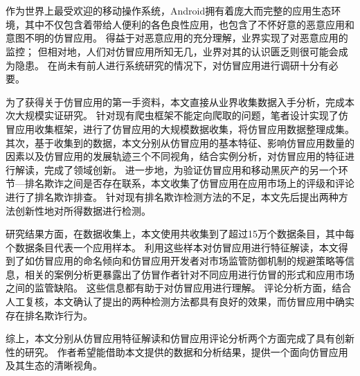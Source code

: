 \cleardoublepage{}

\chapter*{}
\vspace{-5mm}

\setlength{\baselineskip}{25pt} %

作为世界上最受欢迎的移动操作系统，Android拥有着庞大而完整的应用生态环境，其中不仅包含着带给人便利的各色良性应用，也包含了不怀好意的恶意应用和意图不明的仿冒应用。
得益于对恶意应用的充分理解，业界实现了对恶意应用的监控；
但相对地，人们对仿冒应用所知无几，业界对其的认识匮乏则很可能会成为隐患。
在尚未有前人进行系统研究的情况下，对仿冒应用进行调研十分有必要。

为了获得关于仿冒应用的第一手资料，本文直接从业界收集数据入手分析，完成本次大规模实证研究。
针对现有爬虫框架不能定向爬取的问题，笔者设计实现了仿冒应用收集框架\mytool ，进行了仿冒应用的大规模数据收集，将仿冒应用数据整理成集。
其次，基于收集到的数据，本文分别从仿冒应用的基本特征、影响仿冒应用数量的因素以及仿冒应用的发展轨迹三个不同视角，结合实例分析，对仿冒应用的特征进行解读，完成了领域创新。
进一步地，为验证仿冒应用和移动黑灰产的另一个环节---排名欺诈之间是否存在联系，本文收集了仿冒应用在应用市场上的评级和评论进行了排名欺诈排查。
针对现有排名欺诈检测方法的不足，本文先后提出两种方法创新性地对所得数据进行检测。

研究结果方面，在数据收集上，本文使用\mytool 共收集到了超过15万个数据条目，其中每个数据条目代表一个应用样本。
利用这些样本对仿冒应用进行特征解读，本文得到了如仿冒应用的命名倾向和仿冒应用开发者对市场监管防御机制的规避策略等信息，相关的案例分析更暴露出了仿冒作者针对不同应用进行仿冒的形式和应用市场之间的监管缺陷。
这些信息都有助于对仿冒应用进行理解。
评论分析方面，结合人工复核，本文确认了提出的两种检测方法都具有良好的效果，而仿冒应用中确实存在排名欺诈行为。

综上，本文分别从仿冒应用特征解读和仿冒应用评论分析两个方面完成了具有创新性的研究。
作者希望能借助本文提供的数据和分析结果，提供一个面向仿冒应用及其生态的清晰视角。

 
